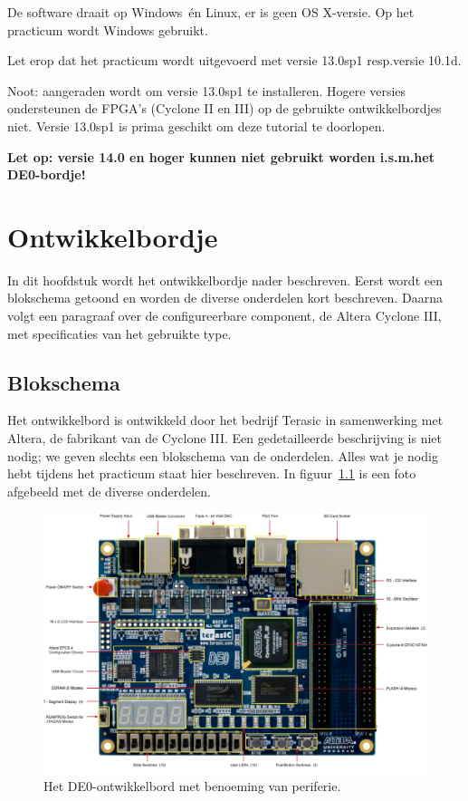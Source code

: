 \documentclass[a4paper,12pt,fleqn,twoside]{book}
\begin{document}
De software draait op Windows\texttrademark\ \'{e}n Linux\texttrademark, er
is geen OS X-versie. Op het practicum wordt Windows gebruikt.

Let erop dat het practicum wordt uitgevoerd met versie 13.0sp1 resp.\@ versie
10.1d.

Noot: aangeraden wordt om versie 13.0sp1 te installeren. Hogere versies
ondersteunen de FPGA's (Cyclone II en III) op de gebruikte ontwikkelbordjes
niet. Versie 13.0sp1 is prima geschikt om deze tutorial te doorlopen.

\textbf{
Let op: versie 14.0 en hoger kunnen niet gebruikt worden i.s.m.\@ het
DE0-bordje!
}



\chapter{Ontwikkelbordje}
\label{chap:ontwikkelbordje}
In dit hoofdstuk wordt het ontwikkelbordje nader beschreven. Eerst wordt een
blokschema getoond en worden de diverse onderdelen kort beschreven. Daarna
volgt een paragraaf over de configureerbare component, de Altera Cyclone III,
met specificaties van het gebruikte type.


\section{Blokschema}
\label{sec:blokschema}
Het ontwikkelbord is ontwikkeld door het bedrijf Terasic in samenwerking met
Altera, de fabrikant van de Cyclone III. Een gedetailleerde beschrijving is
niet nodig; we geven slechts een blokschema van de onderdelen. Alles wat je
nodig hebt tijdens het practicum staat hier beschreven. In
figuur~\ref{fig:DE0-layout-yellow-1000} is een foto afgebeeld met de diverse
onderdelen.

\begin{figure}[H]
\centering
\includegraphics[scale=0.92]{DE0_layout_yellow_1000.jpg}
\caption{Het DE0-ontwikkelbord met benoeming van periferie.}
\label{fig:DE0-layout-yellow-1000}
\end{figure}
\end{document}
